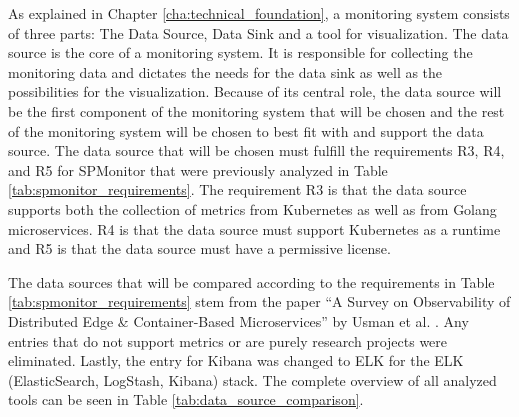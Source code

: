As explained in Chapter \ref{cha:technical_foundation}, a monitoring system
consists of three parts: The Data Source, Data Sink and a tool for
visualization. The data source is the core of a monitoring system. It is
responsible for collecting the monitoring data and dictates the needs for the
data sink as well as the possibilities for the visualization. Because of its
central role, the data source will be the first component of the monitoring
system that will be chosen and the rest of the monitoring system will be chosen
to best fit with and support the data source. The data source that will be
chosen must fulfill the requirements R3, R4, and R5 for SPMonitor that were
previously analyzed in Table \ref{tab:spmonitor_requirements}. The requirement
R3 is that the data source supports both the collection of metrics from
Kubernetes as well as from Golang microservices. R4 is that the data source
must support Kubernetes as a runtime and R5 is that the data source must have a
permissive license.

The data sources that will be compared according to the requirements in Table
\ref{tab:spmonitor_requirements} stem from the paper \enquote{A Survey on Observability of Distributed Edge {\&} Container-Based Microservices} by Usman
et al. \cite{UF+22}. Any entries that do not support metrics or are purely
research projects were eliminated. Lastly, the entry for Kibana was changed to
ELK for the ELK (ElasticSearch, LogStash, Kibana) stack. The complete overview
of all analyzed tools can be seen in Table \ref{tab:data_source_comparison}.

